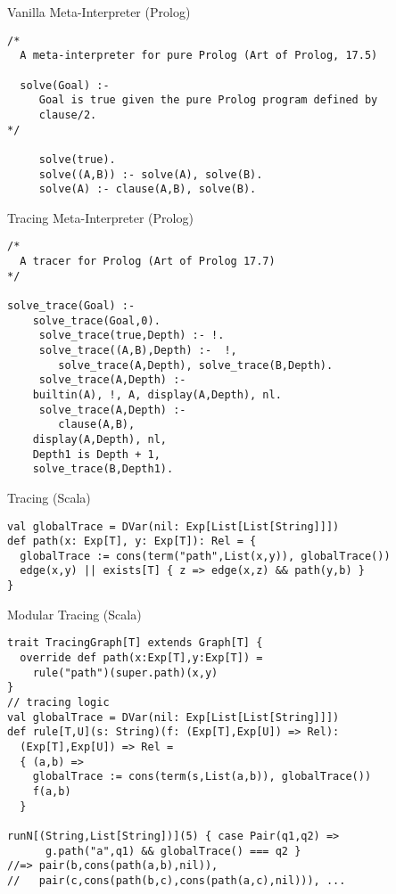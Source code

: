 \documentclass{beamer}
\begin{document}
\begin{frame}[fragile]{Vanilla Meta-Interpreter (Prolog)}
\begin{verbatim}
/*
  A meta-interpreter for pure Prolog (Art of Prolog, 17.5)

  solve(Goal) :-
     Goal is true given the pure Prolog program defined by
     clause/2.
*/

     solve(true).
     solve((A,B)) :- solve(A), solve(B).
     solve(A) :- clause(A,B), solve(B).
\end{verbatim}
\end{frame}

\begin{frame}[fragile]{Tracing Meta-Interpreter (Prolog)}
\begin{verbatim}
/*  
  A tracer for Prolog (Art of Prolog 17.7)
*/
		 
solve_trace(Goal) :-
	solve_trace(Goal,0).
     solve_trace(true,Depth) :- !.
     solve_trace((A,B),Depth) :-  !,
        solve_trace(A,Depth), solve_trace(B,Depth). 
     solve_trace(A,Depth) :-  
	builtin(A), !, A, display(A,Depth), nl.
     solve_trace(A,Depth) :-
        clause(A,B), 
	display(A,Depth), nl,
	Depth1 is Depth + 1, 
	solve_trace(B,Depth1).
\end{verbatim}
\end{frame}

\begin{frame}[fragile]{Tracing (Scala)}
\begin{verbatim}
val globalTrace = DVar(nil: Exp[List[List[String]]])
def path(x: Exp[T], y: Exp[T]): Rel = {
  globalTrace := cons(term("path",List(x,y)), globalTrace())
  edge(x,y) || exists[T] { z => edge(x,z) && path(y,b) }
}
\end{verbatim}
\end{frame}

\begin{frame}[fragile]{Modular Tracing (Scala)}
\begin{verbatim}
trait TracingGraph[T] extends Graph[T] {
  override def path(x:Exp[T],y:Exp[T]) =
    rule("path")(super.path)(x,y)
}
// tracing logic
val globalTrace = DVar(nil: Exp[List[List[String]]])
def rule[T,U](s: String)(f: (Exp[T],Exp[U]) => Rel):
  (Exp[T],Exp[U]) => Rel =
  { (a,b) =>
    globalTrace := cons(term(s,List(a,b)), globalTrace())
    f(a,b)
  }

runN[(String,List[String])](5) { case Pair(q1,q2) =>
      g.path("a",q1) && globalTrace() === q2 }
//=> pair(b,cons(path(a,b),nil)),
//   pair(c,cons(path(b,c),cons(path(a,c),nil))), ...
\end{verbatim}
\end{frame}
\end{document}
